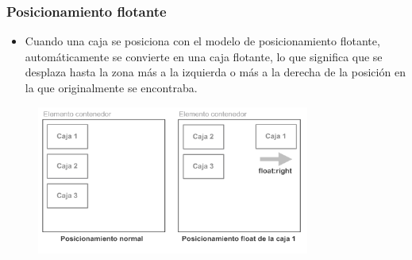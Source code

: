 
\begin{frame}
\frametitle{Posicionamiento flotante}

\begin{itemize}
  \item Cuando una caja se posiciona con el modelo de posicionamiento flotante, automáticamente se convierte en una caja flotante, lo que significa que se desplaza hasta la zona más a la izquierda o más a la derecha de la posición en la que originalmente se encontraba.
\end{itemize}


\begin{center}
\begin{figure}[p]
\includegraphics[width=0.8\textwidth]{figs/f0507.png}
\end{figure}
\end{center}

\end{frame}



